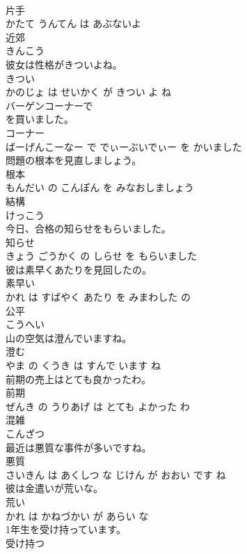 \documentclass[8pt]{extreport}
\begin{document}
\begin{CJK}{UTF8}{min}
\\	片手 
\\	かたて うんてん は あぶないよ			
\\	近郊	
\\	きんこう			
\\	彼女は性格がきついよね。	
\\	きつい 
\\	かのじょ は せいかく が きつい よ ね			
\\	バーゲンコーナーで
\\	を買いました。	
\\	コーナー 
\\	ばーげんこーなー で でぃーぶいでぃー を かいました			
\\	問題の根本を見直しましょう。	
\\	根本 
\\	もんだい の こんぽん を みなおしましょう			
\\	結構	
\\	けっこう			
\\	今日、合格の知らせをもらいました。	
\\	知らせ 
\\	きょう ごうかく の しらせ を もらいました			
\\	彼は素早くあたりを見回したの。	
\\	素早い 
\\	かれ は すばやく あたり を みまわした の			
\\	公平	
\\	こうへい			
\\	山の空気は澄んでいますね。	
\\	澄む 
\\	やま の くうき は すんで います ね			
\\	前期の売上はとても良かったわ。	
\\	前期 
\\	ぜんき の うりあげ は とても よかった わ			
\\	混雑	
\\	こんざつ			
\\	最近は悪質な事件が多いですね。	
\\	悪質 
\\	さいきん は あくしつ な じけん が おおい です ね			
\\	彼は金遣いが荒いな。	
\\	荒い 
\\	かれ は かねづかい が あらい な			
\\	1年生を受け持っています。	
\\	受け持つ 

\end{CJK}
\end{document}
